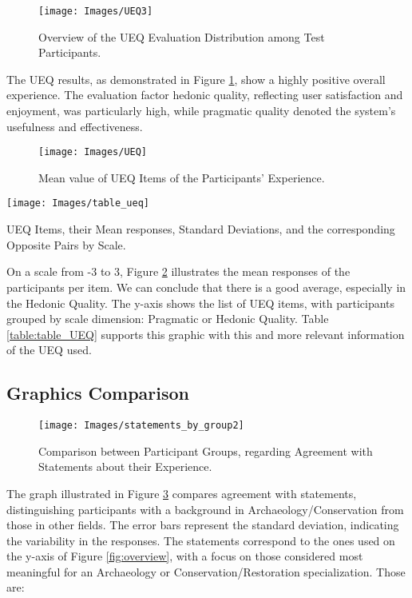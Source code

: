\begin{figure}[h!]
    \centering
    \texttt{[image: Images/UEQ3]}
    \caption{Overview of the \gls{UEQ} Evaluation Distribution among Test Participants.} 
    \label{fig:UEQ2}
\end{figure}


The \gls{UEQ} results, as demonstrated in Figure \ref{fig:UEQ2}, show a highly positive overall experience. 
The evaluation factor hedonic quality, reflecting user satisfaction and enjoyment, was particularly high, while pragmatic quality denoted the system’s usefulness and effectiveness.
\begin{figure}[h!]
    \centering
    \texttt{[image: Images/UEQ]}
    \caption{Mean value of \gls{UEQ} Items of the Participants' Experience.} 
    \label{fig:UEQ1}
\end{figure}
\begin{table}[h!]
    \centering
    \texttt{[image: Images/table\_ueq]}
    \caption{\gls{UEQ} Items, their Mean responses, Standard Deviations, and the corresponding Opposite Pairs by Scale.}
    \label{table:table_UEQ}
\end{table}


On a scale from -3 to 3, Figure \ref{fig:UEQ1} illustrates the mean responses of the participants per item.  
We can conclude that there is a good average, especially in the Hedonic Quality.  
The y-axis shows the list of \gls{UEQ} items, with participants grouped by scale dimension: Pragmatic or Hedonic Quality.  
Table \ref{table:table_UEQ} supports this graphic with this and more relevant information of the \gls{UEQ} used.
\FloatBarrier

\subsection{Graphics Comparison}
\label{sec:comparison}

\begin{figure}[h!]
    \centering
    \texttt{[image: Images/statements\_by\_group2]}
    \caption{Comparison between Participant Groups, regarding Agreement with Statements about their Experience.} 
    \label{fig:statements_background}
\end{figure}

The graph illustrated in Figure \ref{fig:statements_background} compares agreement with statements, distinguishing participants with a background in Archaeology/Conservation from those in other fields. The error bars represent the standard deviation, indicating the variability in the responses.
The statements correspond to the ones used on the y-axis of Figure \ref{fig:overview}, with a focus on those considered most meaningful for an Archaeology or Conservation/Restoration specialization.
Those are: 

